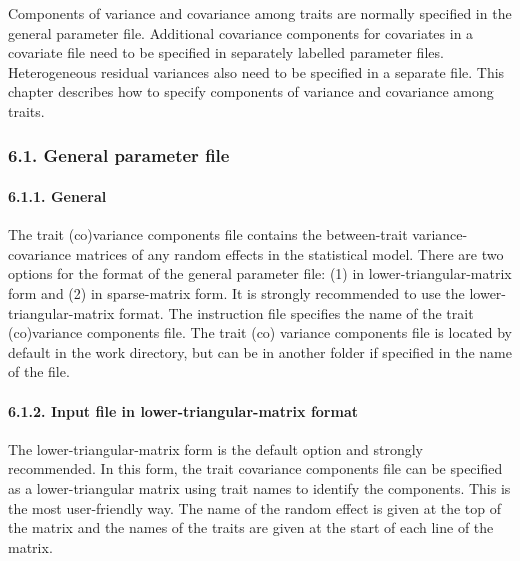 Components of variance and covariance among traits are normally
specified in the general parameter file. Additional covariance
components for covariates in a covariate file need to be specified in
separately labelled parameter files. Heterogeneous residual variances
also need to be specified in a separate file. This chapter describes how
to specify components of variance and covariance among traits.

\subsubsection{6.1. General parameter file}\label{Comp02}

\paragraph{6.1.1. General}\label{Comp03}

The trait (co)variance components file contains the between-trait
variance-covariance matrices of any random effects in the statistical
model. There are two options for the format of the general parameter
file: (1) in lower-triangular-matrix form and (2) in sparse-matrix form.
It is strongly recommended to use the lower-triangular-matrix format.
The instruction file specifies the name of the trait (co)variance
components file. The trait (co) variance components file is located by
default in the work directory, but can be in another folder if specified
in the name of the file.

\paragraph{6.1.2. Input file in lower-triangular-matrix
format}\label{Comp04}

The lower-triangular-matrix form is the default option and strongly
recommended. In this form, the trait covariance components file can be
specified as a lower-triangular matrix using trait names to identify the
components. This is the most user-friendly way. The name of the random
effect is given at the top of the matrix and the names of the traits are
given at the start of each line of the matrix.

